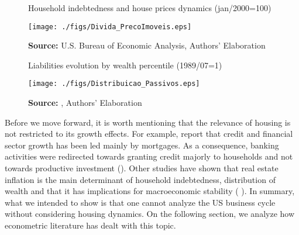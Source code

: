 \begin{figure}[H]
	\centering
	\caption{Household indebtedness and house prices dynamics (jan/2000=100)}
	\label{FigDividaPreco}
	\texttt{[image: ./figs/Divida\_PrecoImoveis.eps]}
	\caption*{\textbf{Source:} U.S. Bureau of Economic Analysis, Authors' Elaboration}
\end{figure}

\begin{figure}[H]
	\centering
	\caption{Liabilities evolution by wealth percentile (1989/07=1)}
	\label{FigDistPassivos}
	\texttt{[image: ./figs/Distribuicao\_Passivos.eps]}
	\caption*{\textbf{Source:} \textcite{us_census_bureau_characteristics_2017}, Authors' Elaboration}
\end{figure}

Before we move forward, it is worth mentioning that the relevance of housing is not restricted to its growth effects. 
For example, \textcite{jorda_great_2016} report that credit and financial sector growth has been led mainly by mortgages. 
As a consequence, banking activities were redirected towards granting credit majorly to households and not towards productive investment (\cites{erturk_banks_2007}{kohl_more_2018}).
Other studies have shown that real estate inflation is the main determinant of household indebtedness, distribution of wealth and that it has implications for macroeconomic stability (\cites{ryoo_household_2015}{stockhammer_debt-driven_2016}{barnes_private_2016}{johnston_global_2017}{mian_household_2017}{anderson_politics_2020}{fuller_housing_2020} ). 
In summary, what we intended to show is that one cannot analyze the US business cycle without considering housing dynamics.
On the following section, we analyze how econometric literature has dealt with this topic.

\begin{comment}
It is worth mentioning the novelty of \textcite{green_follow_1997} and \textcite{leamer_housing_2007} --- revisited in \textcite{leamer_housing_2015} and by \textcite{fiebiger_trend_2017} --- when shedding light on the relevance of residential investment even before of the Great Recession. CITAÇÃO KEYNES DO PROJETO + DUESEMBERRY

\end{comment}
